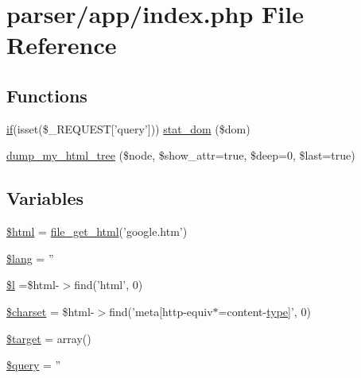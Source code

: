 \hypertarget{parser_2app_2index_8php}{\section{parser/app/index.php File Reference}
\label{parser_2app_2index_8php}
}
\subsection*{Functions}
\begin{DoxyCompactItemize}
\item 
\hyperlink{jquery_8js_ab4c5802d7f227159da47eb29ec6900c0}{if}(isset(\$\+\_\+\+R\+E\+Q\+U\+E\+S\+T\mbox{[}'query'\mbox{]})) \hyperlink{parser_2app_2index_8php_adce4214c78890d0550b16cf943512111}{stat\+\_\+dom} (\$dom)
\item 
\hyperlink{parser_2app_2index_8php_a2441580ba3432116dba4bfa4a9203fbf}{dump\+\_\+my\+\_\+html\+\_\+tree} (\$node, \$show\+\_\+attr=true, \$deep=0, \$last=true)
\end{DoxyCompactItemize}
\subsection*{Variables}
\begin{DoxyCompactItemize}
\item 
\hyperlink{parser_2app_2index_8php_a6f96e7fc92441776c9d1cd3386663b40}{\$html} = \hyperlink{simple__html__dom_8php_af2164941db8b68168c1105687e179d27}{file\+\_\+get\+\_\+html}('google.\+htm')
\item 
\hyperlink{parser_2app_2index_8php_a7714b111b644017933931ec69a154102}{\$lang} = ''
\item 
\hyperlink{parser_2app_2index_8php_a3fc62fd062300c58c188533cbe23e1e5}{\$l} =\$html-\/$>$find('html', 0)
\item 
\hyperlink{parser_2app_2index_8php_af10158dd74b75f1d337e83102d6b82ce}{\$charset} = \$html-\/$>$find('meta\mbox{[}http-\/equiv$\ast$=content-\/\hyperlink{dom__testcase_8php_a2dac418d51f3729b0a56d68ba81f17b1}{type}\mbox{]}', 0)
\item 
\hyperlink{parser_2app_2index_8php_a97f00a3eb3f2c3198313323c8df7dcb2}{\$target} = array()
\item 
\hyperlink{parser_2app_2index_8php_af59a5f7cd609e592c41dc3643efd3c98}{\$query} = ''
\end{DoxyCompactItemize}


